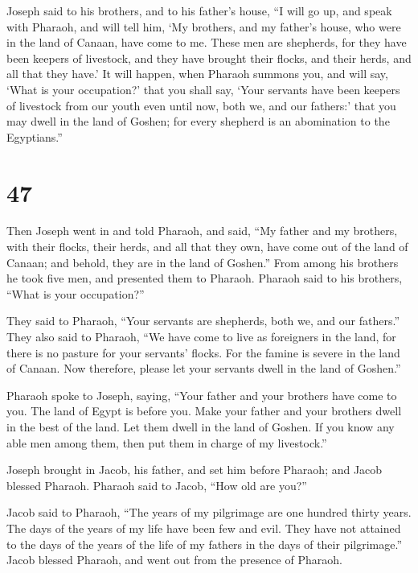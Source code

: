  Joseph said to his brothers, and to his father's house,
``I will go up, and speak with Pharaoh, and will tell him, `My brothers,
and my father's house, who were in the land of Canaan, have come to me.
 These men are shepherds, for they have been keepers of
livestock, and they have brought their flocks, and their herds, and all
that they have.'  It will happen, when Pharaoh summons
you, and will say, `What is your occupation?'  that you
shall say, `Your servants have been keepers of livestock from our youth
even until now, both we, and our fathers:' that you may dwell in the
land of Goshen; for every shepherd is an abomination to the Egyptians.''

\hypertarget{section-46}{%
\section{47}\label{section-46}}

 Then Joseph went in and told Pharaoh, and said, ``My
father and my brothers, with their flocks, their herds, and all that
they own, have come out of the land of Canaan; and behold, they are in
the land of Goshen.''  From among his brothers he took
five men, and presented them to Pharaoh.  Pharaoh said to
his brothers, ``What is your occupation?''

They said to Pharaoh, ``Your servants are shepherds, both we, and our
fathers.''  They also said to Pharaoh, ``We have come to
live as foreigners in the land, for there is no pasture for your
servants' flocks. For the famine is severe in the land of Canaan. Now
therefore, please let your servants dwell in the land of Goshen.''

 Pharaoh spoke to Joseph, saying, ``Your father and your
brothers have come to you.  The land of Egypt is before
you. Make your father and your brothers dwell in the best of the land.
Let them dwell in the land of Goshen. If you know any able men among
them, then put them in charge of my livestock.''

 Joseph brought in Jacob, his father, and set him before
Pharaoh; and Jacob blessed Pharaoh.  Pharaoh said to
Jacob, ``How old are you?''

 Jacob said to Pharaoh, ``The years of my pilgrimage are
one hundred thirty years. The days of the years of my life have been few
and evil. They have not attained to the days of the years of the life of
my fathers in the days of their pilgrimage.''  Jacob
blessed Pharaoh, and went out from the presence of Pharaoh.

